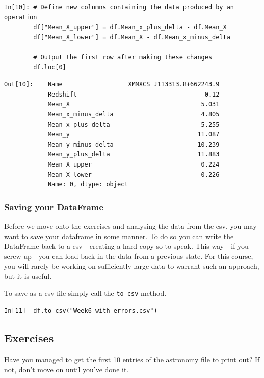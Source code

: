 \begin{lstlisting}[style=PY]
In[10]: # Define new columns containing the data produced by an operation
        df["Mean_X_upper"] = df.Mean_x_plus_delta - df.Mean_X
        df["Mean_X_lower"] = df.Mean_X - df.Mean_x_minus_delta
        
        # Output the first row after making these changes
        df.loc[0]
\end{lstlisting}
\begin{lstlisting}[style=PY_out]
Out[10]:    Name                  XMMXCS J113313.8+662243.9
            Redshift                                   0.12
            Mean_X                                    5.031
            Mean_x_minus_delta                        4.805
            Mean_x_plus_delta                         5.255
            Mean_y                                   11.087
            Mean_y_minus_delta                       10.239
            Mean_y_plus_delta                        11.883
            Mean_X_upper                              0.224
            Mean_X_lower                              0.226
            Name: 0, dtype: object
\end{lstlisting}


\subsubsection{Saving your DataFrame}
Before we move onto the exercises and analysing the data from the csv, you may want to save your dataframe in some manner. To do so you can write the DataFrame back to a csv - creating a hard copy so to speak. This way - if you screw up - you can load back in the data from a previous state. For this course, you will rarely be working on sufficiently large data to warrant such an approach, but it is useful.

To save as a csv file simply call the \texttt{to\_csv} method.

\begin{lstlisting}[style=PY]
In[11]  df.to_csv("Week6_with_errors.csv")
\end{lstlisting}

\subsection{Exercises}
\label{ex1}
Have you managed to get the first 10 entries of the astronomy file to print out? If not, don't move on until you've done it.

